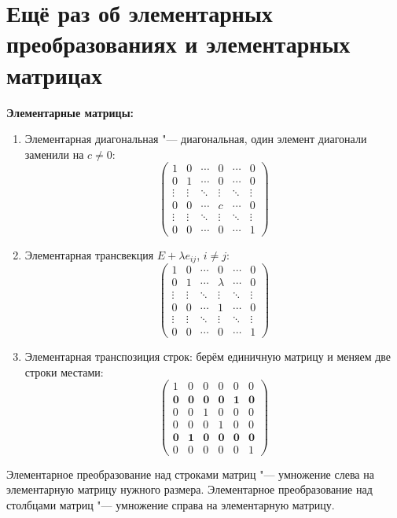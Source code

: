 ﻿\section[Ещё раз об элем-ых преобр-ях и элем-ых матрицах]{Ещё раз об элементарных преобразованиях и элементарных матрицах}

\textbf{Элементарные матрицы:}
\begin{enumerate}
\item
	Элементарная диагональная "--- диагональная, один элемент диагонали заменили на $c \ne 0$:
	\[
		\begin{pmatrix}
			1 & 0 & \cdots & 0 & \cdots & 0 \\
			0 & 1 & \cdots & 0 & \cdots & 0 \\
			\vdots&\vdots&\ddots&\vdots&\ddots&\vdots \\
			0 & 0 & \cdots & c & \cdots & 0 \\
			\vdots&\vdots&\ddots&\vdots&\ddots&\vdots \\
			0 & 0 & \cdots & 0 & \cdots & 1
		\end{pmatrix}
	\]

\item
	Элементарная трансвекция $E + \lambda e_{ij}$, $i \ne j$:
	\[
		\begin{pmatrix}
			1 & 0 & \cdots & 0 & \cdots & 0 \\
			0 & 1 & \cdots & \lambda & \cdots & 0 \\
			\vdots&\vdots&\ddots&\vdots&\ddots&\vdots \\
			0 & 0 & \cdots & 1 & \cdots & 0 \\
			\vdots&\vdots&\ddots&\vdots&\ddots&\vdots \\
			0 & 0 & \cdots & 0 & \cdots & 1
		\end{pmatrix}
	\]

\item
	Элементарная транспозиция строк: берём единичную матрицу и меняем две строки местами:
	\[
		\begin{pmatrix}
			1 & 0 & 0 & 0 & 0 & 0 \\
			\mathbf{0} & \mathbf{0} & \mathbf{0} & \mathbf{0} & \mathbf{1} & \mathbf{0} \\
			0 & 0 & 1 & 0 & 0 & 0 \\
			0 & 0 & 0 & 1 & 0 & 0 \\
			\mathbf{0} & \mathbf{1} & \mathbf{0} & \mathbf{0} & \mathbf{0} & \mathbf{0} \\
			0 & 0 & 0 & 0 & 0 & 1
		\end{pmatrix}
	\]
\end{enumerate}
Элементарное преобразование над строками матриц "--- умножение слева на элементарную матрицу нужного размера.
Элементарное преобразование над столбцами матриц "--- умножение справа на элементарную матрицу.

